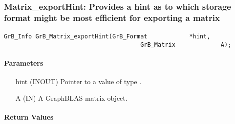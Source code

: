 

\subsubsection{{\sf Matrix\_exportHint}: Provides a hint as to which storage format might be most efficient for exporting a matrix}
\label{Sec:Matrix_exportHint}

\paragraph{\syntax}

\begin{Verbatim}[samepage=true]    
        GrB_Info GrB_Matrix_exportHint(GrB_Format            *hint,
                                       GrB_Matrix             A);
\end{Verbatim}

\paragraph{Parameters}

\begin{itemize}[leftmargin=1.1in]
    \item[{\sf hint}] ({\sf INOUT}) Pointer to a value of type .
    \item[{\sf A}]      ({\sf IN}) A GraphBLAS matrix object.
\end{itemize}

\paragraph{Return Values}

